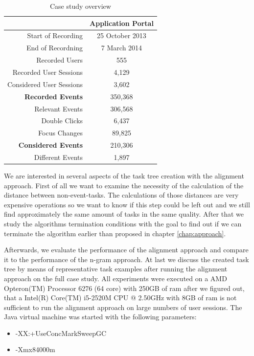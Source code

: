 \begin{table}
	\centering
	 \begin{tabular}{|r|c|}
		   \hline
		   & \textbf{Application Portal }\\
		     \hline
		       Start of Recording & 25 October 2013 \\
		       End of Recordning & 7 March 2014 \\
		       Recorded Users & 555 \\
		       Recorded User Sessions & 4,129 \\
		       Considered User Sessions & 3,602 \\
		       \hline
		         \textbf{Recorded Events} & 350,368 \\
		         Relevant Events & 306,568 \\
		         Double Clicks & 6,437 \\
		         Focus Changes & 89,825 \\
		         \hline
			   \textbf{Considered Events} & 210,306 \\
			   Different Events & 1,897 \\
			   \hline
			    \end{tabular}
			    \caption{Case study overview}
	\label{tab:casestudy2}
\end{table}

We are interested in several aspects of the task tree creation with the alignment approach. 
First of all we want to examine the necessity of the calculation of the distance between non-event-tasks. 
The calculations of those distances are very expensive operations so we want to know if this step could be left out and we still find approximately the same amount of tasks in the same quality.
After that we study the algorithms termination conditions with the goal to find out if we can terminate the algorithm earlier than proposed in chapter \ref{chap:approach}.

Afterwards, we evaluate the performance of the alignment approach and compare it to the performance of the n-gram approach.
At last we discuss the created task tree by means of representative task examples after running the alignment approach on the full case study.
All experiments were executed on a AMD Opteron(TM) Processor 6276 (64 core) with 250GB of ram after we figured out, that a Intel(R) Core(TM) i5-2520M CPU @ 2.50GHz with 8GB of ram is not sufficient to run the alignment approach on large numbers of user sessions.
The Java virtual machine was started with the following parameters:
\begin{itemize}
	\item -XX:+UseConcMarkSweepGC
	\item -Xmx84000m
\end{itemize}

